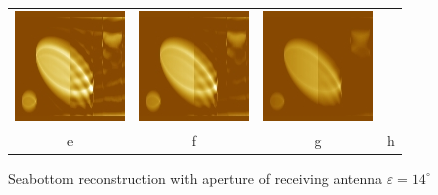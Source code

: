 \documentclass{procDDs}
\begin{document}
\begin{figure}[h!]
\begin{tabular}{cccc}
		\includegraphics[width=0.2\linewidth]{img/13/7.jpg}&
		\includegraphics[width=0.2\linewidth]{img/13/8.jpg}&
		\includegraphics[width=0.2\linewidth]{img/13/9.jpg}\\
		e & f & g & h
	\end{tabular}
	\caption{Seabottom reconstruction with aperture of receiving antenna $\varepsilon=14^\circ$}
	\label{ris:desc5}
\end{figure}
\end{document}
